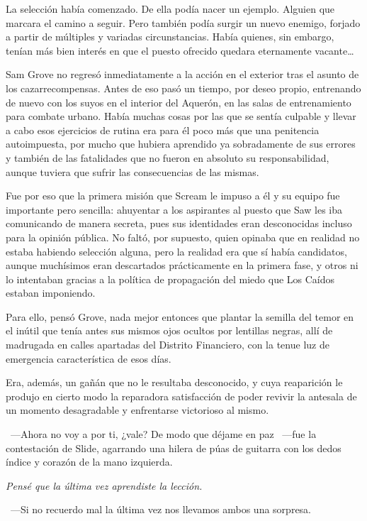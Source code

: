 La selección había comenzado. De ella podía nacer un ejemplo. Alguien que marcara el camino a seguir. Pero también podía surgir un nuevo enemigo, forjado a partir de múltiples y variadas circunstancias.
Había quienes, sin embargo, tenían más bien interés en que el puesto ofrecido quedara eternamente vacante\dots

\fancyparbreak
Sam Grove no regresó inmediatamente a la acción en el exterior tras el asunto de los cazarrecompensas. Antes de eso pasó un tiempo, por deseo propio, entrenando de nuevo con los suyos en el interior del Aquerón, en las salas de entrenamiento para combate urbano. Había muchas cosas por las que se sentía culpable y llevar a cabo esos ejercicios de rutina era para él poco más que una penitencia autoimpuesta, por mucho que hubiera aprendido ya sobradamente de sus errores y también de las fatalidades que no fueron en absoluto su responsabilidad, aunque tuviera que sufrir las consecuencias de las mismas.

Fue por eso que la primera misión que Scream le impuso a él y su equipo fue importante pero sencilla: ahuyentar a los aspirantes al puesto que Saw les iba comunicando de manera secreta, pues sus identidades eran desconocidas incluso para la opinión pública. No faltó, por supuesto, quien opinaba que en realidad no estaba habiendo selección alguna, pero la realidad era que sí había candidatos, aunque muchísimos eran descartados prácticamente en la primera fase, y otros ni lo intentaban gracias a la política de propagación del miedo que Los Caídos estaban imponiendo.

Para ello, pensó Grove, nada mejor entonces que plantar la semilla del temor en el inútil que tenía antes sus mismos ojos ocultos por lentillas negras, allí de madrugada en calles apartadas del Distrito Financiero, con la tenue luz de emergencia característica de esos días.

Era, además, un gañán que no le resultaba desconocido, y cuya reaparición le produjo en cierto modo la reparadora satisfacción de poder revivir la antesala de un momento desagradable y enfrentarse victorioso al mismo.

~---Ahora no voy a por ti, ¿vale? De modo que déjame en paz ~---fue la contestación de Slide, agarrando una hilera de púas de guitarra con los dedos índice y corazón de la mano izquierda.

\emph{Pensé que la última vez aprendiste la lección.}

~---Si no recuerdo mal la última vez nos llevamos ambos una sorpresa.

